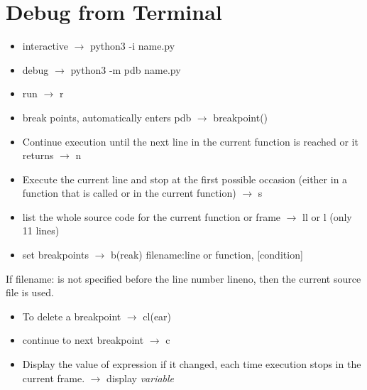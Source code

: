 \documentclass{article}
\begin{document}
\section{Debug from Terminal}

\begin{itemize}
\item interactive $\rightarrow$ python3 -i name.py
\item debug $\rightarrow$ python3 -m pdb name.py \cite{pdb}
\item run $\rightarrow$ r
\item break points, automatically enters pdb $\rightarrow$  breakpoint()
\item Continue execution until the next line in the current function is reached or it returns $\rightarrow$ n
\item Execute the current line and stop at the first possible occasion (either in a function that is called or in the current function)  $\rightarrow$ s
\item list the whole source code for the current function or frame $\rightarrow$ ll  or l (only 11 lines)
\item set breakpoints $\rightarrow$ b(reak) filename:line or function, [condition]
\end{itemize}
If filename: is not specified before the line number lineno, then the current source file is used.
\begin{itemize}
\item To delete a breakpoint $\rightarrow$ cl(ear)
\item continue to next breakpoint $\rightarrow$ c
\item Display the value of expression if it changed, each time execution stops in the current frame. $\rightarrow$  display \textit{variable}
\end{itemize}
\end{document}
